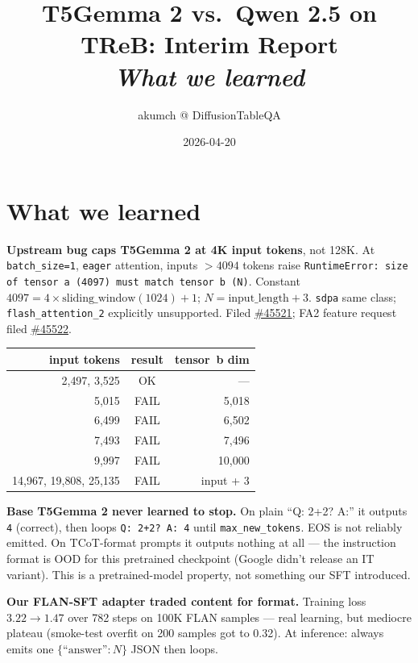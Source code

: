 \documentclass[11pt]{article}
\title{\vspace{-2em}\textbf{T5Gemma 2 vs.\ Qwen 2.5 on TReB: Interim Report}\\
\vspace{0.2em}\large{\normalfont\itshape What we learned}}
\author{\small akumch @ DiffusionTableQA}
\date{\small 2026-04-20}
\begin{document}
\maketitle
\vspace{-2em}

\section{What we learned}

\textbf{Upstream bug caps T5Gemma 2 at 4K input tokens}, not 128K. At \texttt{batch\_size=1}, \texttt{eager} attention, inputs $>4094$ tokens raise \texttt{RuntimeError: size of tensor a (4097) must match tensor b (N)}. Constant $4097 = 4\times\text{sliding\_window}(1024)+1$; $N=\text{input\_length}+3$. \texttt{sdpa} same class; \texttt{flash\_attention\_2} explicitly unsupported. Filed \href{https://github.com/huggingface/transformers/issues/45521}{\#45521}; FA2 feature request filed \href{https://github.com/huggingface/transformers/issues/45522}{\#45522}.

\begin{center}\small
\begin{tabular}{rcr}
\toprule
\textbf{input tokens} & \textbf{result} & \textbf{tensor~b dim} \\
\midrule
2{,}497, 3{,}525 & OK & --- \\
5{,}015 & FAIL & 5{,}018 \\
6{,}499 & FAIL & 6{,}502 \\
7{,}493 & FAIL & 7{,}496 \\
9{,}997 & FAIL & 10{,}000 \\
14{,}967, 19{,}808, 25{,}135 & FAIL & input + 3 \\
\bottomrule
\end{tabular}
\end{center}

\textbf{Base T5Gemma 2 never learned to stop.} On plain ``Q: 2+2? A:'' it outputs \texttt{4} (correct), then loops \texttt{Q: 2+2? A: 4} until \texttt{max\_new\_tokens}. EOS is not reliably emitted. On TCoT-format prompts it outputs nothing at all --- the instruction format is OOD for this pretrained checkpoint (Google didn't release an IT variant). This is a pretrained-model property, not something our SFT introduced.

\textbf{Our FLAN-SFT adapter traded content for format.} Training loss $3.22\!\to\!1.47$ over 782 steps on 100K FLAN samples --- real learning, but mediocre plateau (smoke-test overfit on 200 samples got to 0.32). At inference: always emits one $\{\text{``answer''}: N\}$ JSON then loops.
\end{document}
